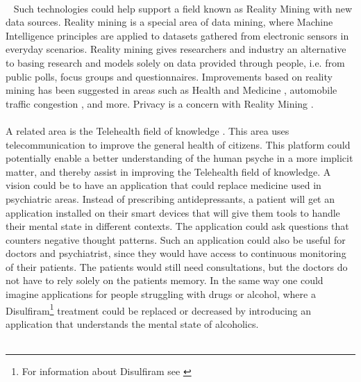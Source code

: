 \\\
Such technologies could help support a field known as Reality Mining \parencite{eagle2006_reality_mining_definition} with new data sources. Reality mining is a special area of data mining, where Machine Intelligence principles are applied to datasets gathered from electronic sensors in everyday scenarios. Reality mining gives researchers and industry an alternative to basing research and models solely on data provided through people, i.e. from public polls, focus groups and questionnaires. Improvements based on reality mining has been suggested in areas such as Health and Medicine \parencite{pentland2009_reality_mining_health_medicine}, automobile traffic congestion \parencite{pentland2009reality_mining_mobile_communication_gps}, and more. Privacy is a concern with Reality Mining \parencite{madan2009_reality_mining_privacy}.      
\\\\
A related area is the Telehealth field of knowledge \parencite{telehealth_aau}. This area uses telecommunication to improve the general health of citizens. This platform could potentially enable a better understanding of the human psyche in a more implicit matter, and thereby assist in improving the Telehealth field of knowledge. A vision could be to have an application that could replace medicine used in psychiatric areas. Instead of prescribing antidepressants, a patient will get an application installed on their smart devices that will give them tools to handle their mental state in different contexts. The application could ask questions that counters negative thought patterns. Such an application could also be useful for doctors and psychiatrist, since they would have access to continuous monitoring of their patients. The patients would still need consultations, but the doctors do not have to rely solely on the patients memory. In the same way one could imagine applications for people struggling with drugs or alcohol, where a Disulfiram\footnote{For information about Disulfiram see \textcite{nlm_disulfiram}} treatment could be replaced or decreased by introducing an application that understands the mental state of alcoholics.
\\\\
